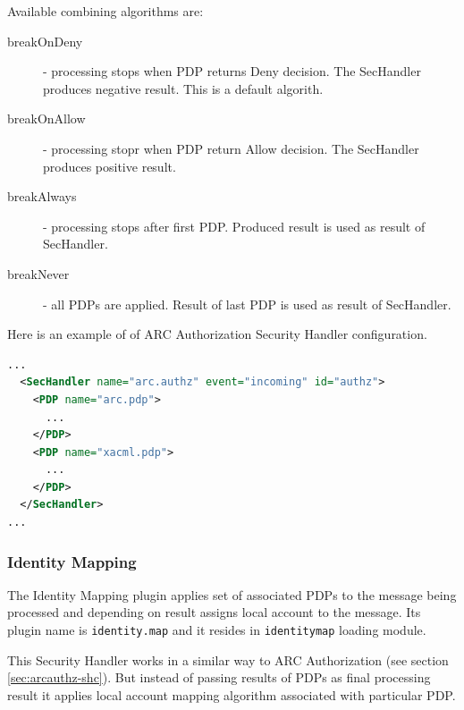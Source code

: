 \documentclass{article}
\begin{document}
Available combining algorithms are:
\begin{description}
\item[breakOnDeny] - processing stops when PDP returns Deny decision. The SecHandler
produces negative result. This is a default algorith.
\item[breakOnAllow] - processing stopr when PDP return Allow decision. The SecHandler
produces positive result.
\item[breakAlways] - processing stops after first PDP. Produced result is used as
result of SecHandler.
\item[breakNever] - all PDPs are applied. Result of last PDP is used as result of
SecHandler.
\end{description}
Here is an example of of ARC Authorization Security Handler configuration.
\begin{lstlisting}[language=xml]
...
  <SecHandler name="arc.authz" event="incoming" id="authz">
    <PDP name="arc.pdp">
      ...
    </PDP>
    <PDP name="xacml.pdp">
      ...
    </PDP>
  </SecHandler>
...
\end{lstlisting}


\subsubsection{Identity Mapping}\label{sec:identitymap-shc}
The Identity Mapping plugin applies set of associated PDPs to the message
being processed and depending on result assigns local account to the
message. Its plugin name is \texttt{identity.map} and it resides in
\texttt{identitymap} loading module.

This Security Handler works in a similar way to ARC Authorization (see
section \ref{sec:arcauthz-shc}). But instead of passing results of PDPs as
final processing result it applies local account mapping algorithm
associated with particular PDP.
\end{document}
